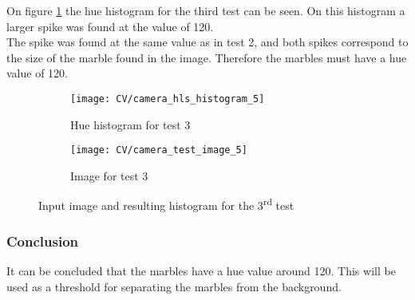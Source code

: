 \documentclass[../Head/Main.tex]{subfiles}
\begin{document}
On figure \ref{fig:hist_test_3} the hue histogram for the third test can be seen. On this histogram a larger spike was found at the value of 120.\\
The spike was found at the same value as in test 2, and both spikes correspond to the size of the marble found in the image. Therefore the marbles must have a hue value of 120.
\begin{figure}[H]
	\centering
	\begin{subfigure}[b]{0.48\textwidth}
		\centering
		\texttt{[image: CV/camera\_hls\_histogram\_5]}
		\caption{Hue histogram for test 3}
		\label{fig:hist_test_3}
	\end{subfigure}
	\hfill
	\begin{subfigure}[b]{0.5\textwidth}
		\centering
		\texttt{[image: CV/camera\_test\_image\_5]}
		\caption{Image for test 3}
		\label{fig:image_test_3}
	\end{subfigure}
	\caption{Input image and resulting histogram for the 3\textsuperscript{rd} test}
	\label{fig:test_3}
\end{figure}


\subsubsection*{Conclusion}

It can be concluded that the marbles have a hue value around 120. This will be used as a threshold for separating the marbles from the background.
\end{document}
